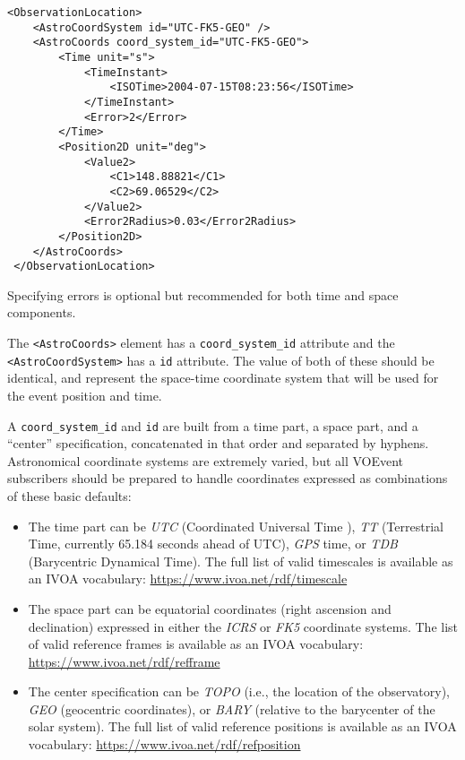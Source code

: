 \documentclass[11pt,a4paper]{ivoa}
\begin{document}
\begin{lstlisting}
<ObservationLocation>
    <AstroCoordSystem id="UTC-FK5-GEO" />
    <AstroCoords coord_system_id="UTC-FK5-GEO">
        <Time unit="s">
            <TimeInstant>
                <ISOTime>2004-07-15T08:23:56</ISOTime>
            </TimeInstant>
            <Error>2</Error>
        </Time>
        <Position2D unit="deg">
            <Value2>
                <C1>148.88821</C1>
                <C2>69.06529</C2>
            </Value2>
            <Error2Radius>0.03</Error2Radius>
        </Position2D>
    </AstroCoords>
 </ObservationLocation>
\end{lstlisting}

Specifying errors is optional but recommended for both time and space
components.

The \texttt{<AstroCoords>} element has a \texttt{coord\_system\_id} attribute and the 
\texttt{<AstroCoordSystem>} has a \texttt{id} attribute. The value of both of these 
should be identical, and represent the space-time coordinate system that will be 
used for the event position and time. 

A \texttt{coord\_system\_id} and \texttt{id} are built from a time part, a space part, 
and a ``center'' specification, concatenated in that order and separated by 
hyphens. Astronomical coordinate systems are extremely varied, but all VOEvent 
subscribers should be prepared to handle coordinates expressed as combinations 
of these basic defaults: 
\begin{itemize}
\item The time part can be \emph{UTC} (Coordinated Universal Time
\citep{bib26}), \emph{TT} (Terrestrial Time, currently 65.184 seconds ahead of
UTC), \emph{GPS} time, or \emph{TDB} (Barycentric Dynamical Time). The full list
of valid timescales is available as an IVOA vocabulary:
\url{https://www.ivoa.net/rdf/timescale}
\item The space part can be equatorial coordinates (right ascension and
declination) expressed in either the \emph{ICRS} or \emph{FK5} coordinate
systems. The list of valid reference frames is available as an IVOA vocabulary:
\url{https://www.ivoa.net/rdf/refframe}
\item The center specification can be \emph{TOPO} (i.e., the location of the
observatory), \emph{GEO} (geocentric coordinates), or \emph{BARY} (relative to
the barycenter of the solar system). The full list of valid reference positions
is available as an IVOA vocabulary: \url{https://www.ivoa.net/rdf/refposition}
\end{itemize}
\end{document}
